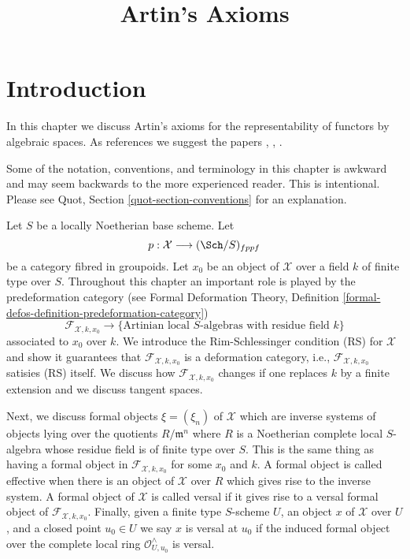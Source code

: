 

%


\title{Artin's Axioms}

\maketitle

\label{section-phantom}

\tableofcontents




\section{Introduction}
\label{section-introduction}

\noindent
In this chapter we discuss Artin's axioms for the representability of
functors by algebraic spaces. As references we suggest the papers
\cite{ArtinI}, \cite{ArtinII}, \cite{ArtinVersal}.

\medskip\noindent
Some of the notation, conventions, and terminology in this chapter is awkward
and may seem backwards to the more experienced reader. This is intentional.
Please see Quot, Section \ref{quot-section-conventions} for an
explanation.

\medskip\noindent
Let $S$ be a locally Noetherian base scheme. Let
$$
p : \mathcal{X} \longrightarrow (\Sch/S)_{fppf}
$$
be a category fibred in groupoids. Let $x_0$ be an object of $\mathcal{X}$
over a field $k$ of finite type over $S$. Throughout this chapter an important
role is played by the predeformation category
(see Formal Deformation Theory,
Definition \ref{formal-defos-definition-predeformation-category})
$$
\mathcal{F}_{\mathcal{X}, k, x_0}
\longrightarrow
\{\text{Artinian local }S\text{-algebras with residue field }k\}
$$
associated to $x_0$ over $k$. We introduce the Rim-Schlessinger condition (RS)
for $\mathcal{X}$ and show it guarantees that
$\mathcal{F}_{\mathcal{X}, k, x_0}$ is a deformation category, i.e.,
$\mathcal{F}_{\mathcal{X}, k, x_0}$ satisies (RS) itself.
We discuss how $\mathcal{F}_{\mathcal{X}, k, x_0}$
changes if one replaces $k$ by a finite extension
and we discuss tangent spaces.

\medskip\noindent
Next, we discuss formal objects $\xi = (\xi_n)$ of $\mathcal{X}$ which are
inverse systems of objects lying over the quotients $R/\mathfrak m^n$
where $R$ is a Noetherian complete local $S$-algebra whose residue field
is of finite type over $S$. This is the same thing as having a formal
object in $\mathcal{F}_{\mathcal{X}, k, x_0}$ for some $x_0$ and $k$.
A formal object is called effective when there is an object of
$\mathcal{X}$ over $R$ which gives rise to the inverse system.
A formal object of $\mathcal{X}$ is called versal if it gives rise to a
versal formal object of $\mathcal{F}_{\mathcal{X}, k, x_0}$.
Finally, given a finite type $S$-scheme $U$, an object $x$
of $\mathcal{X}$ over $U$, and a closed point $u_0 \in U$ we say
$x$ is versal at $u_0$ if the induced formal object over the complete
local ring $\mathcal{O}_{U, u_0}^\wedge$ is versal.


